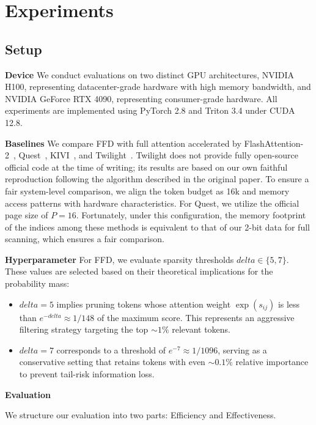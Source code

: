 \documentclass[]{mosi}
\def\delta{delta}%
\theoremstyle{plain}
\theoremstyle{definition}
\theoremstyle{remark}
\begin{document}
\section{Experiments}
\subsection{Setup}
\label{sec:experiments_setup}

\textbf{Device} 
We conduct evaluations on two distinct GPU architectures, NVIDIA H100, representing datacenter-grade hardware with high memory bandwidth, and NVIDIA GeForce RTX 4090, representing consumer-grade hardware. All experiments are implemented using PyTorch 2.8 and Triton 3.4 under CUDA 12.8.

\textbf{Baselines} 
We compare FFD with full attention accelerated by FlashAttention-2~\citep{dao2023flashattention}, Quest~\citep{tang2024quest}, KIVI~\citep{liu2024kivi}, and Twilight~\citep{lin2025twilight}. Twilight does not provide fully open-source official code at the time of writing; its results are based on our own faithful reproduction following the algorithm described in the original paper. To ensure a fair system-level comparison, we align the token budget as 16k and memory access patterns with hardware characteristics.
For Quest, we utilize the official page size of $P=16$. Fortunately, under this configuration, the memory footprint of the indices among these methods is equivalent to that of our 2-bit data for full scanning, which ensures a fair comparison.

\textbf{Hyperparameter} 
For FFD, we evaluate sparsity thresholds $\delta \in \{5, 7\}$. These values are selected based on their theoretical implications for the probability mass:
\begin{itemize}
    \itemsep0em
    \item $\delta=5$ implies pruning tokens whose attention weight $\exp(s_{ij})$ is less than $e^{-\delta} \approx 1/148$ of the maximum score. This represents an aggressive filtering strategy targeting the top $\sim 1\%$ relevant tokens.
    \item $\delta=7$ corresponds to a threshold of $e^{-7} \approx 1/1096$, serving as a conservative setting that retains tokens with even $\sim 0.1\%$ relative importance to prevent tail-risk information loss.
\end{itemize}

\textbf{Evaluation}

We structure our evaluation into two parts: Efficiency and Effectiveness.
\end{document}
